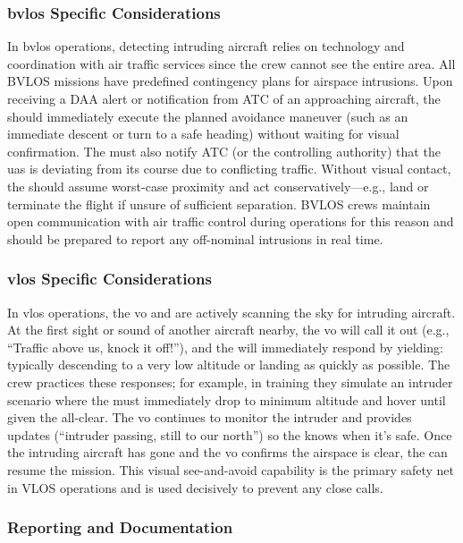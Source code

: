             \subsubsection{\ac{bvlos} Specific Considerations} In \ac{bvlos} operations, detecting intruding aircraft relies on technology and coordination with air traffic services since the crew cannot see the entire area. All BVLOS missions have predefined contingency plans for airspace intrusions. Upon receiving a DAA alert or notification from ATC of an approaching aircraft, the  should immediately execute the planned avoidance maneuver (such as an immediate descent or turn to a safe heading) without waiting for visual confirmation. The  must also notify ATC (or the controlling authority) that the \ac{uas} is deviating from its course due to conflicting traffic. Without visual contact, the  should assume worst-case proximity and act conservatively—e.g., land or terminate the flight if unsure of sufficient separation. BVLOS crews maintain open communication with air traffic control during operations for this reason and should be prepared to report any off-nominal intrusions in real time.
 
            \subsubsection{\ac{vlos} Specific Considerations} In \ac{vlos} operations, the \ac{vo} and  are actively scanning the sky for intruding aircraft. At the first sight or sound of another aircraft nearby, the \ac{vo} will call it out (e.g., “Traffic above us, knock it off!”), and the  will immediately respond by yielding: typically descending to a very low altitude or landing as quickly as possible. The crew practices these responses; for example, in training they simulate an intruder scenario where the  must immediately drop to minimum altitude and hover until given the all-clear. The \ac{vo} continues to monitor the intruder and provides updates (“intruder passing, still to our north”) so the  knows when it's safe. Once the intruding aircraft has gone and the \ac{vo} confirms the airspace is clear, the  can resume the mission. This visual see-and-avoid capability is the primary safety net in VLOS operations and is used decisively to prevent any close calls.
 
            \subsubsection{Reporting and Documentation}
            
